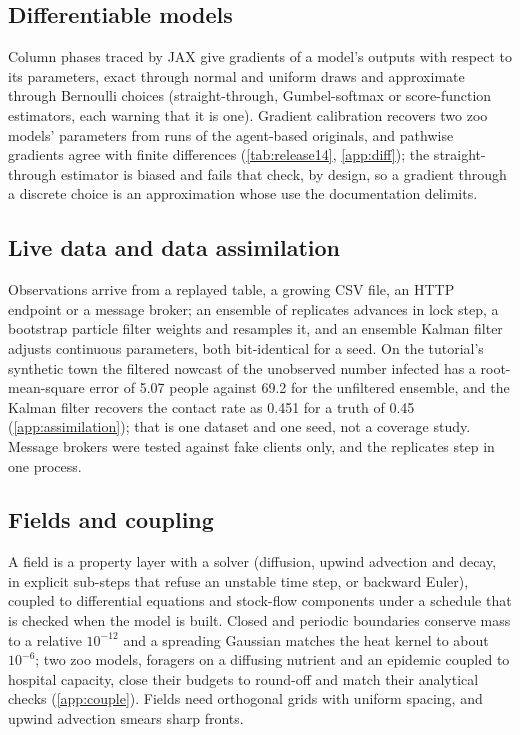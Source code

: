 \subsection{Differentiable models}
\label{sec:diff}

Column phases traced by JAX give gradients of a model's outputs with respect to its
parameters, exact through normal and uniform draws and approximate through Bernoulli choices
(straight-through, Gumbel-softmax or score-function estimators, each warning that it is one).
Gradient calibration recovers two zoo models' parameters from runs of the agent-based
originals, and pathwise gradients agree with finite differences (\cref{tab:release14},
\cref{app:diff}); the straight-through estimator is biased and fails that check, by design, so
a gradient through a discrete choice is an approximation whose use the documentation delimits.

\subsection{Live data and data assimilation}
\label{sec:assimilation}

Observations arrive from a replayed table, a growing CSV file, an HTTP endpoint or a message
broker; an ensemble of replicates advances in lock step, a bootstrap particle filter
\citep{gordon1993novel} weights and resamples it, and an ensemble Kalman filter
\citep{evensen2003ensemble} adjusts continuous parameters, both bit-identical for a seed. On
the tutorial's synthetic town the filtered nowcast of the unobserved number infected has a
root-mean-square error of 5.07 people against 69.2 for the unfiltered ensemble, and the
Kalman filter recovers the contact rate as 0.451 for a truth of 0.45 (\cref{app:assimilation});
that is one dataset and one seed, not a coverage study. Message brokers were tested against
fake clients only, and the replicates step in one process.

\subsection{Fields and coupling}
\label{sec:couple}

A field is a property layer with a solver (diffusion, upwind advection and decay, in explicit
sub-steps that refuse an unstable time step, or backward Euler), coupled to differential
equations and stock-flow components under a schedule that is checked when the model is built.
Closed and periodic boundaries conserve mass to a relative $10^{-12}$ and a spreading Gaussian
matches the heat kernel to about $10^{-6}$; two zoo models, foragers on a diffusing nutrient
and an epidemic coupled to hospital capacity, close their budgets to round-off and match their
analytical checks (\cref{app:couple}). Fields need orthogonal grids with uniform spacing, and
upwind advection smears sharp fronts.

